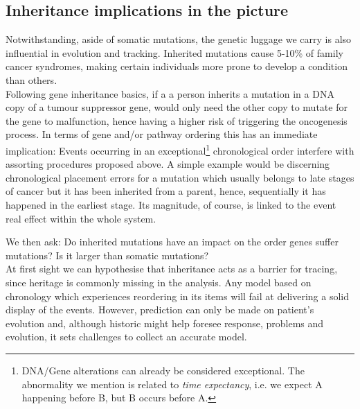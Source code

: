 \subsection{Inheritance implications in the picture}

Notwithstanding, aside of somatic mutations, the genetic luggage we carry is also influential in evolution and tracking. Inherited mutations cause 5-10\% of family cancer syndromes, making certain individuals more prone to develop a condition than others.
\\

Following gene inheritance basics, if a a person inherits a mutation in a DNA copy of a tumour suppressor gene, would only need the other copy to mutate for the gene to malfunction, hence having a higher risk of triggering the oncogenesis process. In terms of gene and/or pathway ordering this has an immediate implication: Events occurring in an exceptional\footnote{DNA/Gene alterations can already be considered exceptional. The abnormality we mention is related to \emph{time expectancy}, i.e. we expect A happening before B, but B occurs before A.} chronological order interfere with assorting procedures proposed above. A simple example would be discerning chronological placement errors for a mutation which usually belongs to late stages of cancer but it has been inherited from a parent, hence, sequentially it has happened in the earliest stage. Its magnitude, of course, is linked to the event real effect within the whole system.

We then ask: Do inherited mutations have an impact on the order genes suffer mutations? Is it larger than somatic mutations?
\\

At first sight we can hypothesise that inheritance acts as a barrier for tracing, since heritage is commonly missing in the analysis. Any model based on chronology which experiences reordering in its items will fail at delivering a solid display of the events. However, prediction can only be made on patient’s evolution and, although historic might help foresee response, problems and evolution, it sets challenges to collect an accurate model.